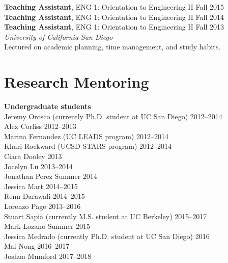 \documentclass[]{res}
\begin{document}
\begin{resume}
\textbf{Teaching Assistant}, ENG 1: Orientation to Engineering II \hfill Fall 2015 \\
\textbf{Teaching Assistant}, ENG 1: Orientation to Engineering II \hfill Fall 2014 \\
\textbf{Teaching Assistant}, ENG 1: Orientation to Engineering II \hfill Fall 2013 \\
\textit{University of California San Diego} \\
Lectured on academic planning, time management, and study habits.



\section{Research Mentoring}
\vspace{0.1in}

\textbf{Undergraduate students} \\
Jeremy Orosco (currently Ph.D. student at UC San Diego) \hfill 2012--2014 \\
Alex Corliss \hfill 2012--2013 \\
Marina Fernandez (UC LEADS program) \hfill 2012--2014 \\
Khari Rockward (UCSD STARS program) \hfill 2012--2014 \\
Ciara Dooley \hfill 2013 \\
Jocelyn Lu \hfill 2013--2014 \\
Jonathan Perez \hfill Summer 2014 \\
Jessica Mart \hfill 2014--2015 \\
Renn Darawali \hfill 2014--2015 \\
Lorenzo Page \hfill 2013--2016 \\
Stuart Sapia (currently M.S. student at UC Berkeley) \hfill 2015--2017 \\
Mark Lozano \hfill Summer 2015 \\
Jessica Medrado (currently Ph.D. student at UC San Diego) \hfill 2016 \\
Mai Nong \hfill 2016--2017 \\
Joshua Mumford \hfill 2017--2018



\end{resume}
\end{document}
